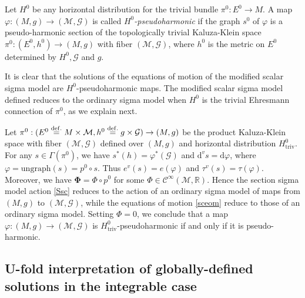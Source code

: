 \documentclass[10pt, cmp, numbook, final, a4paper]{svjour}
\newcommand*{\SavedEqref}{}
\let\SavedEqref\eqref
\renewcommand*{\eqref}[1]{%
  \begingroup
    \hypersetup{
      linkcolor=blue,
      linkbordercolor=blue,
    }%
    \SavedEqref{#1}%
  \endgroup
}
\newcommand{\eqdef}{\stackrel{{\rm def.}}{=}}
\def\R{\mathbb{R}}
\def\dd{\mathrm{d}}
\def\ungraph{\mathrm{ungraph}}
\def\cC{{\mathcal C}}
\newcommand{\cM}{\mathcal{M}}
\def\cG{\mathcal{G}}
\def\cC{\mathcal{C}}
\def\bPhi{\mathbf{\Phi}}
\def\triv{\mathrm{triv}}
\begin{document}
\begin{definition}
Let $H^0$ be any horizontal distribution for the trivial bundle
$\pi^0\colon E^0\rightarrow M$.  A map $\varphi:(M,g)\rightarrow
(\cM,\cG)$ is called {\em $H^0$-pseudoharmonic} if the graph $s^0$ of
$\varphi$ is a pseudo-harmonic section of the topologically trivial
Kaluza-Klein space $\pi^0\colon (E^0,h^{0})\rightarrow (M,g)$ with
fiber $(\cM,\cG)$, where $h^{0}$ is the metric on $E^{0}$ determined
by $H^{0}, \cG$ and $g$.
\end{definition}

\noindent 
It is clear that the solutions of the equations of motion of the
modified scalar sigma model are $H^0$-pseudoharmonic maps. The
modified scalar sigma model defined reduces to the ordinary sigma
model when $H^0$ is the trivial Ehresmann connection of $\pi^0$, as we
explain next.


\begin{remark}
Let $\pi^0:(E^0\eqdef M\times\cM, h^0\eqdef g\times \cG)\rightarrow
(M,g)$ be the product Kaluza-Klein space with fiber $(\cM,\cG)$
defined over $(M,g)$ and horizontal distribution $H^{0}_{\triv}$. For
any $s\in \Gamma(\pi^0)$, we have $s^\ast(h)=\varphi^\ast (\cG)$ and
$\dd^v s=\dd \varphi$, where $\varphi=\ungraph(s)=p^0\circ s$. Thus
$e^v(s)=e(\varphi)$ and $\tau^v(s)=\tau(\varphi)$. Moreover, we have
$\bPhi=\Phi\circ p^0$ for some $\Phi\in \cC^\infty(\cM,\R)$. Hence the
section sigma model action \eqref{Ssc} reduces to the action of an
ordinary sigma model of maps from $(M,g)$ to $(\cM,\cG)$, while the
equations of motion \eqref{sceom} reduce to those of an ordinary sigma
model. Setting $\Phi=0$, we conclude that a map
$\varphi:(M,g)\rightarrow (\cM,\cG)$ is $H^0_\triv$-pseudoharmonic if
and only if it is pseudo-harmonic.
\end{remark}

\subsection{U-fold interpretation of globally-defined solutions in the integrable case}
\label{subsec:sigmaUfold}
\end{document}
